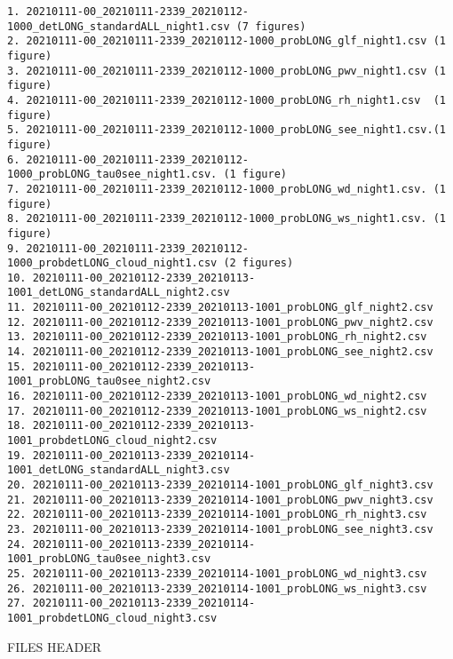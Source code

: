 \documentclass[11pt,english]{article}
\begin{document}
\begin{verbatim}
1. 20210111-00_20210111-2339_20210112-1000_detLONG_standardALL_night1.csv (7 figures)
2. 20210111-00_20210111-2339_20210112-1000_probLONG_glf_night1.csv (1 figure)
3. 20210111-00_20210111-2339_20210112-1000_probLONG_pwv_night1.csv (1 figure)
4. 20210111-00_20210111-2339_20210112-1000_probLONG_rh_night1.csv  (1 figure)
5. 20210111-00_20210111-2339_20210112-1000_probLONG_see_night1.csv.(1 figure)
6. 20210111-00_20210111-2339_20210112-1000_probLONG_tau0see_night1.csv. (1 figure)
7. 20210111-00_20210111-2339_20210112-1000_probLONG_wd_night1.csv. (1 figure)
8. 20210111-00_20210111-2339_20210112-1000_probLONG_ws_night1.csv. (1 figure)
9. 20210111-00_20210111-2339_20210112-1000_probdetLONG_cloud_night1.csv (2 figures)
10. 20210111-00_20210112-2339_20210113-1001_detLONG_standardALL_night2.csv
11. 20210111-00_20210112-2339_20210113-1001_probLONG_glf_night2.csv
12. 20210111-00_20210112-2339_20210113-1001_probLONG_pwv_night2.csv
13. 20210111-00_20210112-2339_20210113-1001_probLONG_rh_night2.csv
14. 20210111-00_20210112-2339_20210113-1001_probLONG_see_night2.csv
15. 20210111-00_20210112-2339_20210113-1001_probLONG_tau0see_night2.csv
16. 20210111-00_20210112-2339_20210113-1001_probLONG_wd_night2.csv
17. 20210111-00_20210112-2339_20210113-1001_probLONG_ws_night2.csv
18. 20210111-00_20210112-2339_20210113-1001_probdetLONG_cloud_night2.csv
19. 20210111-00_20210113-2339_20210114-1001_detLONG_standardALL_night3.csv
20. 20210111-00_20210113-2339_20210114-1001_probLONG_glf_night3.csv
21. 20210111-00_20210113-2339_20210114-1001_probLONG_pwv_night3.csv
22. 20210111-00_20210113-2339_20210114-1001_probLONG_rh_night3.csv
23. 20210111-00_20210113-2339_20210114-1001_probLONG_see_night3.csv
24. 20210111-00_20210113-2339_20210114-1001_probLONG_tau0see_night3.csv
25. 20210111-00_20210113-2339_20210114-1001_probLONG_wd_night3.csv
26. 20210111-00_20210113-2339_20210114-1001_probLONG_ws_night3.csv
27. 20210111-00_20210113-2339_20210114-1001_probdetLONG_cloud_night3.csv
\end{verbatim}

FILES HEADER 
\end{document}
